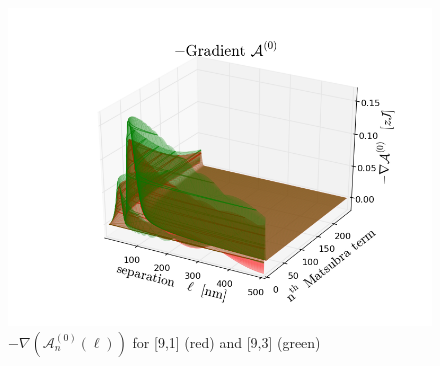 \documentclass[a4paper]{article}
\begin{document}
\begin{center}
\begin{figure}[t!]
\begin{center}
\includegraphics[width=1.2\textwidth]{plots/A0_wire2_3.png}
\hskip 43pt
\caption{$-\nabla(\mathcal{A}_{n}^{(0)}(\ell))$ for [9,1] (red) and [9,3] (green)}
\label{eiz65}
\end{center}
\end{figure} 



\end{center}
\end{document}
